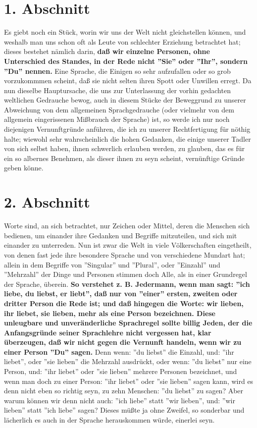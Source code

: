 \begin{description}
\end{description}
\normalsize

\section{1. Abschnitt} \label{kap10_ab1}

Es giebt noch ein Stück, worin wir uns der Welt nicht gleichstellen können, und
weshalb man uns schon oft als Leute von schlechter Erziehung betrachtet hat;
dieses bestehet nämlich darin, \textbf{daß wir einzelne Personen, ohne Unterschied des
Standes, in der Rede nicht ''Sie'' oder ''Ihr'', sondern ''Du'' nennen.} Eine
Sprache, die Einigen so sehr aufzufallen oder so grob vorzukommmen scheint, daß
sie nicht selten ihren Spott oder Unwillen erregt. Da nun dieselbe Hauptursache,
die uns zur Unterlassung der vorhin gedachten weltlichen Gedrauche bewog, auch
in diesem Stücke der Beweggrund zu unserer Abweichung von dem allgemeinen
Sprachgedrauche (oder vielmehr von dem allgemein eingerissenen Mißbrauch der
Sprache) ist, so werde ich nur noch diejenigen Vernunftgründe anführen, die ich
zu unserer Rechtfertigung für nöthig halte; wiewohl sehr wahrscheinlich die
hohen Gedanken, die einige unserer Tadler von sich selbst haben, ihnen
schwerlich erlauben werden, zu glauben, das es für ein so albernes Benehmen, als
dieser ihnen zu seyn scheint, vernünftige Gründe geben könne.

\section{2. Abschnitt} \label{kap10_ab2}

Worte sind, an sich betrachtet, nur Zeichen oder Mittel, deren die Menschen sich
bedienen, um einander ihre Gedanken und Begriffe mitzuteilen, und sich mit
einander zu unterreden. Nun ist zwar die Welt in viele Völkerschaften
eingetheilt, von denen fast jede ihre besondere Sprache und von verschiedene
Mundart hat; allein in dem Begriffe von ''Singular'' und ''Plural'', oder
''Einzahl'' und ''Mehrzahl'' der Dinge und Personen stimmen doch Alle, als in
einer Grundregel der Sprache, überein. \textbf{So verstehet z. B. Jedermann, wenn man
sagt: ''ich liebe, du liebst, er liebt'', daß nur von ''einer'' ersten, zweiten
oder dritter Person die Rede ist; und daß hingegen die Worte: wir lieben, ihr
liebet, sie lieben, mehr als eine Person bezeichnen. Diese unleugbare und
unveränderliche Sprachregel sollte billig Jeden, der die Anfangsgründe seiner
Sprachlehre nicht vergessen hat, klar überzeugen, daß wir nicht gegen die
Vernunft handeln, wenn wir zu einer Person ''Du'' sagen.} Denn wenn: ''du
liebst'' die Einzahl, und: ''ihr liebet'', oder ''sie lieben'' die Mehrzahl
ausdrückt, oder wenn: ''du liebst'' nur eine Person, und: ''ihr liebet'' oder
''sie lieben'' mehrere Personen bezeichnet, und wenn man doch zu einer Person:
''ihr liebet'' oder ''sie lieben'' sagen kann, wird es denn nicht eben so
richtig seyn, zu zehn Menschen: ''du liebst'' zu sagen? Aber warum können wir
denn nicht auch: ''ich liebe'' statt ''wir lieben'', und: ''wir lieben'' statt
''ich liebe'' sagen? Dieses müßte ja ohne Zweifel, so sonderbar und lächerlich
es auch in der Sprache herauskommen würde, einerlei seyn.

